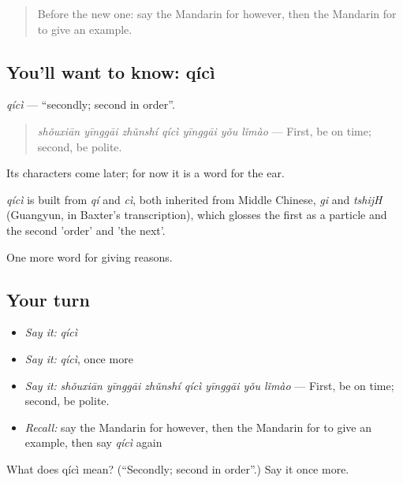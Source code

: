 \label{lesson:ZH-C369-qici}



\begin{quote}
Before the new one: say the Mandarin for however, then the Mandarin for to give an example.
\end{quote}

\subsection*{You'll want to know: qícì}
\emph{qícì} — \textquotedblleft{}secondly; second in order\textquotedblright{}.

\begin{quote}
\emph{shǒuxiān yīnggāi zhǔnshí qícì yīnggāi yǒu lǐmào} — First, be on time; second, be polite.
\end{quote}

Its characters come later; for now it is a word for the ear.

\begin{cousinweb}
\emph{qícì} is built from \emph{qí} and \emph{cì}, both inherited from Middle Chinese, \emph{gi} and \emph{tshijH} (Guangyun, in Baxter's transcription), which glosses the first as a particle and the second 'order' and 'the next'.
\end{cousinweb}

\begin{grammarlens}[title={What you've built}]
One more word for giving reasons.
\end{grammarlens}

\subsection*{Your turn}
\begin{itemize}
\raggedright
  \item \emph{Say it:} \emph{qícì}
  \item \emph{Say it:} \emph{qícì}, once more
  \item \emph{Say it:} \emph{shǒuxiān yīnggāi zhǔnshí qícì yīnggāi yǒu lǐmào} — First, be on time; second, be polite.
  \item \emph{Recall:} say the Mandarin for however, then the Mandarin for to give an example, then say \emph{qícì} again
\end{itemize}

\begin{tcolorbox}[breakable,colback=teal!4,colframe=teal!35!black,title={Before you move on}]
What does qícì mean? (\textquotedblleft{}Secondly; second in order\textquotedblright{}.) Say it once more.
\end{tcolorbox}
